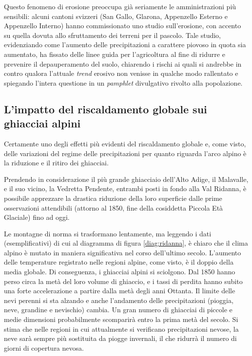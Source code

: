 \documentclass[14pt,a4paper]{article}
\begin{document}
	Questo fenomeno di erosione preoccupa già seriamente le amministrazioni più sensibili: alcuni cantoni svizzeri (San Gallo, Glarona, Appenzello Esterno e Appenzello Interno) hanno commissionato uno studio \cite{Bodenerosion_2016-07-07} sull'erosione, con accento su quella dovuta allo sfruttamento dei terreni per il pascolo. Tale studio, evidenziando come l'aumento delle precipitazioni a carattere piovoso in quota sia aumentato, ha fissato delle linee guida per l'agricoltura al fine di ridurre e prevenire il depauperamento del suolo, chiarendo i rischi ai quali si andrebbe in contro qualora l'attuale \textit{trend} erosivo non venisse in qualche modo rallentato e spiegando l'intera questione in un \textit{pamphlet} divulgativo rivolto alla popolazione.
	
	\subsection{L'impatto del riscaldamento globale sui ghiacciai alpini}
		Certamente uno degli effetti più evidenti del riscaldamento globale e, come visto, delle variazioni del regime delle precipitazioni  per quanto riguarda l'arco alpino è la riduzione e il ritiro dei ghiacciai.
		
		Prendendo in considerazione il più grande ghiacciaio dell'Alto Adige, il Malavalle, e il suo vicino, la Vedretta Pendente, entrambi posti in fondo alla Val Ridanna, è possibile apprezzare la drastica riduzione della loro superficie dalle prime osservazioni attendibili (attorno al 1850, fine della cosiddetta Piccola Età Glaciale) fino ad oggi.
		
		Le montagne di norma si trasformano lentamente, ma leggendo i dati (esemplificativi) di cui al diagramma di figura \ref{diag:ridanna}, è chiaro che il clima alpino è mutato in
		maniera significativa nel corso dell'ultimo secolo. L'aumento delle temperature registrato nelle regioni alpine, come visto, è il doppio della media
		globale. Di conseguenza, i ghiacciai alpini si sciolgono. Dal 1850 hanno perso circa la metà del loro volume di
		ghiaccio, e i tassi di perdita hanno subito una forte accelerazione a partire dalla metà degli anni Ottanta.
		Il limite delle nevi perenni si sta alzando e anche l'andamento delle precipitazioni (pioggia, neve, grandine e
		nevischio) cambia. Un gran numero di ghiacciai di piccole e medie dimensioni probabilmente scomparirà entro la
		prima metà del secolo. Si stima che nelle regioni in cui attualmente si verificano precipitazioni nevose, la neve sarà
		sempre più sostituita da piogge invernali, il che ridurrà il numero di giorni di copertura nevosa. 
		
\end{document}
